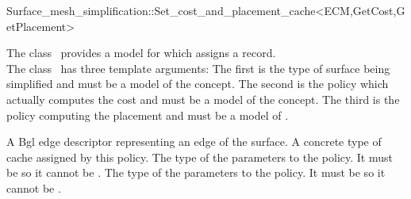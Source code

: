 

\begin{ccRefClass}{Surface_mesh_simplification::Set_cost_and_placement_cache<ECM,GetCost,GetPlacement>}


\ccDefinition

The class \ccRefName\ provides a model for
 which assigns a  record.\\
The class \ccRefName\ has three template arguments: The first is the type of surface
being simplified and must be a model of the  concept.
The second is the policy which actually computes the cost and must be a model
of the  concept. The third is the policy computing the placement
and must be a model of .

\ccIsModel
{}


\ccTypes
  \ccGlue
  {A {\sc Bgl} edge descriptor representing an edge of the surface.}
  \ccGlue
  {A concrete type of cache assigned by this policy.}
  \ccGlue
  {The type of the parameters to the  policy.
  It must be  so it cannot be .}
  \ccGlue
  {The type of the parameters to the   policy. 
  It must be  so it cannot be .} 
            

\end{ccRefClass}
